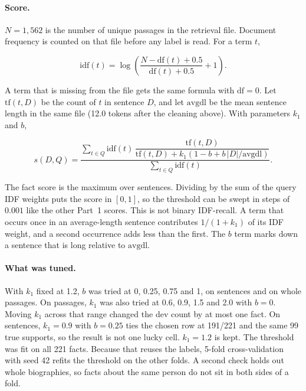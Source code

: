 \documentclass[12pt,a4paper]{article}
\begin{document}
\paragraph{Score.}
$N = 1{,}562$ is the number of unique passages in the retrieval file. Document frequency is counted on that file before any label is read. For a term $t$,

\begin{equation}
\mathrm{idf}(t) = \log\left(\frac{N - \mathrm{df}(t) + 0.5}{\mathrm{df}(t) + 0.5} + 1\right).
\end{equation}

A term that is missing from the file gets the same formula with $\mathrm{df} = 0$. Let $\mathrm{tf}(t, D)$ be the count of $t$ in sentence $D$, and let $\mathrm{avgdl}$ be the mean sentence length in the same file (12.0 tokens after the cleaning above). With parameters $k_1$ and $b$,

\begin{equation}
s(D, Q) = \frac{\sum_{t \in Q} \mathrm{idf}(t)\, \dfrac{\mathrm{tf}(t, D)}{\mathrm{tf}(t, D) + k_1 \left(1 - b + b\,|D|/\mathrm{avgdl}\right)}}{\sum_{t \in Q} \mathrm{idf}(t)}.
\end{equation}

The fact score is the maximum over sentences. Dividing by the sum of the query IDF weights puts the score in $[0, 1]$, so the threshold can be swept in steps of $0.001$ like the other Part~1 scores. This is not binary IDF-recall. A term that occurs once in an average-length sentence contributes $1/(1 + k_1)$ of its IDF weight, and a second occurrence adds less than the first. The $b$ term marks down a sentence that is long relative to $\mathrm{avgdl}$.

\paragraph{What was tuned.}
With $k_1$ fixed at 1.2, $b$ was tried at 0, 0.25, 0.75 and 1, on sentences and on whole passages. On passages, $k_1$ was also tried at 0.6, 0.9, 1.5 and 2.0 with $b = 0$. Moving $k_1$ across that range changed the dev count by at most one fact. On sentences, $k_1 = 0.9$ with $b = 0.25$ ties the chosen row at 191/221 and the same 99 true supports, so the result is not one lucky cell. $k_1 = 1.2$ is kept. The threshold was fit on all 221 facts. Because that reuses the labels, 5-fold cross-validation with seed 42 refits the threshold on the other folds. A second check holds out whole biographies, so facts about the same person do not sit in both sides of a fold.
\end{document}
